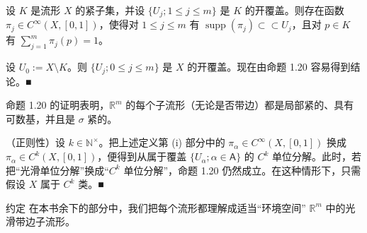 \begin{remark}

\begin{items}
\item

设 $ K $ 是流形 $ X $ 的紧子集，并设 $ \{U_j; 1 \le j \le m\} $ 是 $ K $ 的开覆盖。则存在函数 $ \pi_j \in C^{\infty}(X, [0,1]) $，使得对 $ 1 \le j \le m $ 有 $ \operatorname{supp}(\pi_j) \subset\subset U_j $，且对 $ p \in K $ 有 $ \sum_{j=1}^{m} \pi_j(p) = 1 $。

\proofhead
设 $ U_0 := X \setminus K $。则 $ \{U_j; 0 \le j \le m\} $ 是 $ X $ 的开覆盖。现在由命题 1.20 容易得到结论。\nobreak\hspace{0.35em}■
\item

命题 1.20 的证明表明，$ \mathbb{R}^m $ 的每个子流形（无论是否带边）都是局部紧的、具有可数基，并且是 $ \sigma $ 紧的。

\item

（正则性）设 $ k \in \mathbb{N}^{\times} $。把上述定义第 (i) 部分中的 $ \pi_{\alpha} \in C^{\infty}(X, [0,1]) $ 换成 $ \pi_{\alpha} \in C^{k}(X, [0,1]) $，便得到从属于覆盖 $ \{U_{\alpha}; \alpha \in \mathsf{A}\} $ 的 $ C^{k} $ 单位分解。此时，若把“光滑单位分解”换成“$ C^{k} $ 单位分解”，命题 1.20 仍然成立。在这种情形下，只需假设 $ X $ 属于 $ C^{k} $ 类。\nobreak\hspace{0.35em}■

\end{items}

约定 在本书余下的部分中，我们把每个流形都理解成适当“环境空间” $ \mathbb{R}^m $ 中的光滑带边子流形。

\end{remark}

\exerciseshead

